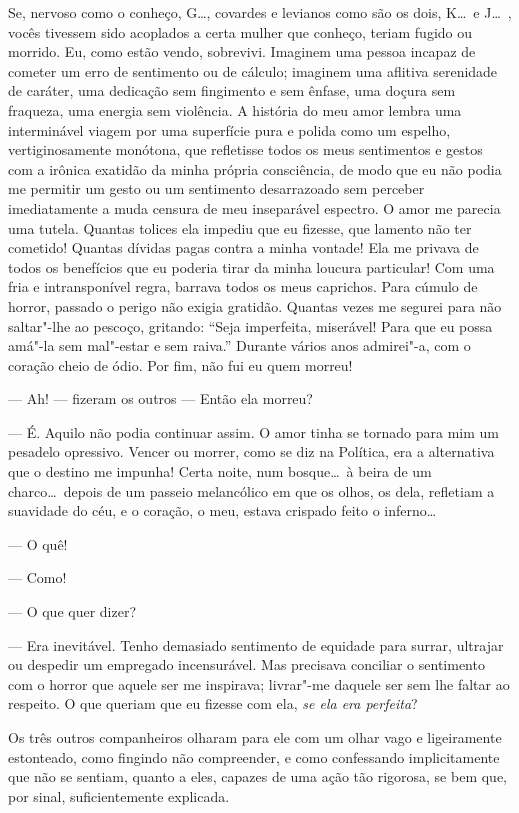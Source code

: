 Se, nervoso como o conheço, G\ldots, covardes e levianos
como são os dois, K\ldots\  e J\ldots\ , vocês tivessem sido acoplados a 
certa mulher que conheço, teriam fugido ou morrido. Eu, como
estão vendo, sobrevivi. Imaginem uma pessoa incapaz de cometer um erro
de sentimento ou de cálculo; imaginem uma aflitiva serenidade de
caráter, uma dedicação sem fingimento e sem ênfase, uma doçura sem
fraqueza, uma energia sem violência. A história do meu amor lembra
uma interminável viagem por uma superfície pura e polida como um
espelho, vertiginosamente monótona, que refletisse todos os meus
sentimentos e gestos com a irônica exatidão da minha própria
consciência, de modo que eu não podia me permitir um gesto ou um
sentimento desarrazoado sem perceber imediatamente a muda censura de
meu inseparável espectro. O amor me parecia uma tutela. Quantas
tolices ela impediu que eu fizesse, que lamento não ter cometido!
Quantas dívidas pagas contra a minha vontade! Ela me privava de todos
os benefícios que eu poderia tirar da minha loucura particular!
Com uma fria e intransponível regra, barrava todos os meus
caprichos. Para cúmulo de horror, passado o
perigo não exigia gratidão. Quantas vezes me segurei para não saltar"-lhe ao pescoço,
gritando: “Seja imperfeita, miserável! Para que
eu possa amá"-la sem mal"-estar e sem raiva.'' Durante
vários anos admirei"-a, com o coração cheio de ódio. Por fim, não fui eu
quem morreu!

--- Ah! --- fizeram os outros --- Então ela morreu?

--- É. Aquilo não podia continuar assim. O amor tinha se tornado para mim
um pesadelo opressivo. Vencer ou morrer, como se diz na Política, era a
alternativa que o destino me impunha! Certa noite, num bosque\ldots\  à
beira de um charco\ldots\  depois de um passeio melancólico em que os
olhos, os dela, refletiam a suavidade do céu, e o coração, o
meu, estava crispado feito o inferno\ldots\ 

--- O quê!

--- Como!

--- O que quer dizer?

--- Era inevitável. Tenho demasiado sentimento de equidade para
surrar, ultrajar ou despedir um empregado incensurável. Mas precisava conciliar o sentimento com o horror que aquele ser me 
inspirava; livrar"-me daquele ser sem lhe faltar ao respeito. 
O que queriam que eu fizesse com ela, \textit{se ela era
perfeita}?

Os três outros companheiros olharam para ele com um olhar vago e
ligeiramente estonteado, como fingindo não compreender, e como 
confessando implicitamente que não se sentiam, quanto a eles, capazes
de uma ação tão rigorosa, se bem que, por sinal, suficientemente
explicada.

